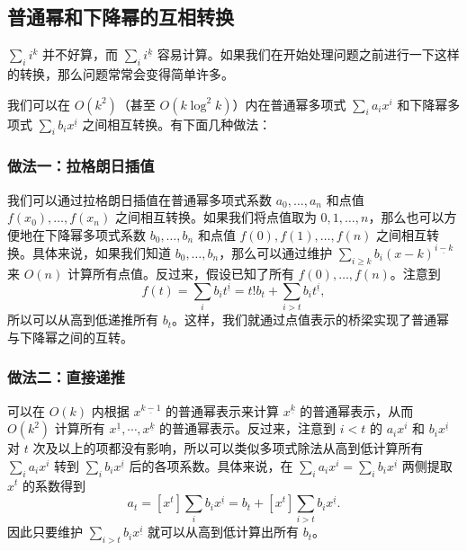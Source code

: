 \subsection{普通幂和下降幂的互相转换}
    $\sum_i i^k$ 并不好算，而 $\sum_i i^{\underline{k}}$ 容易计算。如果我们在开始处理问题之前进行一下这样的转换，那么问题常常会变得简单许多。

    我们可以在 $O(k^2)$（甚至 $O(k\log^2 k)$）内在普通幂多项式 $\sum_i a_ix^i$ 和下降幂多项式 $\sum_i b_ix^{\underline{i}}$ 之间相互转换。有下面几种做法：

    \subsubsection*{做法一：拉格朗日插值}
    我们可以通过拉格朗日插值在普通幂多项式系数 $a_0,\ldots,a_n$ 和点值 $f(x_0),\ldots,f(x_n)$ 之间相互转换。如果我们将点值取为 $0,1,\ldots,n$，那么也可以方便地在下降幂多项式系数 $b_0,\ldots,b_n$ 和点值 $f(0),f(1),\ldots,f(n)$ 之间相互转换。具体来说，如果我们知道 $b_0,\ldots,b_n$，那么可以通过维护 $\sum_{i\ge k}b_i(x-k)^{\underline{i-k}}$ 来 $O(n)$ 计算所有点值。反过来，假设已知了所有 $f(0),\ldots,f(n)$。注意到
    $$
    f(t)=\sum_{i}b_it^{\underline{i}}=t!b_t+\sum_{i>t}b_i t^{\underline{i}},
    $$
    所以可以从高到低递推所有 $b_t$。这样，我们就通过点值表示的桥梁实现了普通幂与下降幂之间的互转。

    \subsubsection*{做法二：直接递推}
    可以在 $O(k)$ 内根据 $x^{\underline{k-1}}$ 的普通幂表示来计算 $x^{\underline{k}}$ 的普通幂表示，从而 $O(k^2)$ 计算所有 $x^{\underline{1}},\cdots,x^{\underline{k}}$ 的普通幂表示。反过来，注意到 $i<t$ 的 $a_ix^i$ 和 $b_ix^{\underline{i}}$ 对 $t$ 次及以上的项都没有影响，所以可以类似多项式除法从高到低计算所有 $\sum_{i}a_ix^i$ 转到 $\sum_i b_ix^{\underline{i}}$ 后的各项系数。具体来说，在 $\sum_i a_ix^i=\sum_{i}b_ix^{\underline{i}}$ 两侧提取 $x^t$ 的系数得到
    $$
    a_t=[x^t]\sum_i b_ix^{\underline{i}}=b_t+[x^t]\sum_{i>t}b_ix^{\underline{i}}.
    $$
    因此只要维护 $\sum_{i>t}b_ix^{\underline{i}}$ 就可以从高到低计算出所有 $b_t$。

